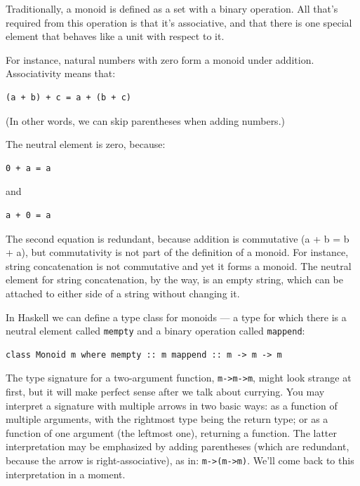Traditionally, a monoid is defined as a set with a binary operation. All
that's required from this operation is that it's associative, and that
there is one special element that behaves like a unit with respect to
it.

For instance, natural numbers with zero form a monoid under addition.
Associativity means that:

\begin{verbatim}
(a + b) + c = a + (b + c)
\end{verbatim}

(In other words, we can skip parentheses when adding numbers.)

The neutral element is zero, because:

\begin{verbatim}
0 + a = a
\end{verbatim}

and

\begin{verbatim}
a + 0 = a
\end{verbatim}

The second equation is redundant, because addition is commutative (a + b
= b + a), but commutativity is not part of the definition of a monoid.
For instance, string concatenation is not commutative and yet it forms a
monoid. The neutral element for string concatenation, by the way, is an
empty string, which can be attached to either side of a string without
changing it.

In Haskell we can define a type class for monoids --- a type for which
there is a neutral element called \texttt{mempty} and a binary operation
called \texttt{mappend}:

\begin{verbatim}
class Monoid m where mempty :: m mappend :: m -> m -> m
\end{verbatim}

The type signature for a two-argument function,
\texttt{m-\textgreater{}m-\textgreater{}m}, might look strange at first,
but it will make perfect sense after we talk about currying. You may
interpret a signature with multiple arrows in two basic ways: as a
function of multiple arguments, with the rightmost type being the return
type; or as a function of one argument (the leftmost one), returning a
function. The latter interpretation may be emphasized by adding
parentheses (which are redundant, because the arrow is
right-associative), as in: \texttt{m-\textgreater{}(m-\textgreater{}m)}.
We'll come back to this interpretation in a moment.

